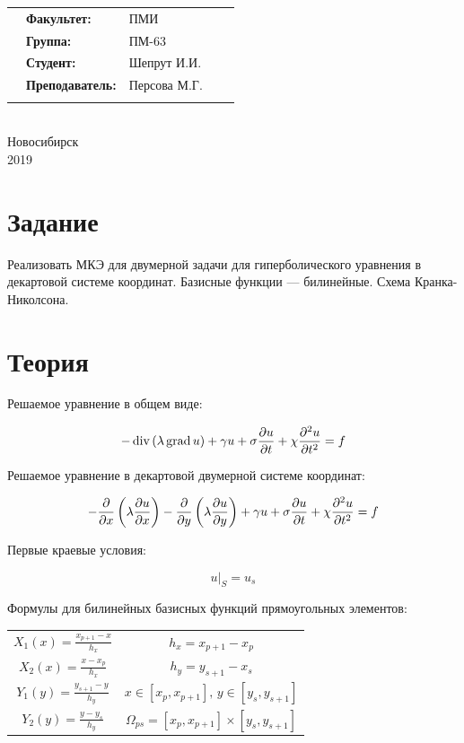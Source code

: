 \begin{center}
{\begin{tabular}{cllp{1.5cm}p{1.5cm}}
& \textbf{Факультет:} & ПМИ & & \\[1.25ex]
& \textbf{Группа:} & ПМ-63 & & \\[1.25ex]
& \textbf{Студент:} & Шепрут И.И. & & \\[1.25ex]
& \textbf{Преподаватель:} & Персова М.Г. & & \\[1.25ex]
&  &  & & \\[1.25ex]
\end{tabular}} \\
\hfill \break
\hfill \break
\hfill \break
\hfill \break
\hfill \break
\large{Новосибирск\\2019}
\end{center}
\thispagestyle{empty}
\newpage 
\setcounter{page}{1}

\section{Задание}

Реализовать МКЭ для двумерной задачи для гиперболического уравнения в декартовой системе координат. Базисные функции --- билинейные. Схема Кранка-Николсона.

\section{Теория}

Решаемое уравнение в общем виде:

$$ -\operatorname{div}\left(\lambda\operatorname{grad} u\right) + \gamma u + \sigma \frac{\partial u}{\partial t} + \chi \frac{\partial^{2} u}{\partial t^{2}} = f $$

Решаемое уравнение в декартовой двумерной системе координат:

$$ -\frac{\partial }{\partial x}\left(\lambda\frac{\partial u}{\partial x}\right) - \frac{\partial }{\partial y}\left(\lambda\frac{\partial u}{\partial y}\right) + \gamma u + \sigma \frac{\partial u}{\partial t} + \chi \frac{\partial^{2} u}{\partial t^{2}} = f $$

Первые краевые условия:

$$ u|_{S} = u_s $$

Формулы для билинейных базисных функций прямоугольных элементов:

\begin{center}\noindent\begin{tabular}{cc}
$\displaystyle X_1(x) = \frac{x_{p+1}-x}{h_x} $ & $\displaystyle h_x = x_{p+1}-x_p $ \\
$\displaystyle X_2(x) = \frac{x-x_p}{h_x} $ & $\displaystyle h_y = y_{s+1}-x_s $ \\
$\displaystyle Y_1(y) = \frac{y_{s+1}-y}{h_y} $ & $\displaystyle x \in [x_p, x_{p+1}],\, y \in [y_s, y_{s+1}] $ \\
$\displaystyle Y_2(y) = \frac{y-y_s}{h_y} $ & $\displaystyle \Omega_{ps} = [x_p, x_{p+1}] \times [y_s, y_{s+1}] $
\end{tabular}\end{center}

